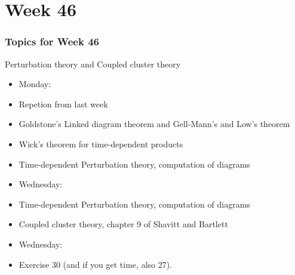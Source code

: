 \section{Week 46}
\frame
{
  \frametitle{Topics for Week 46}
  \begin{block}{Perturbation theory and Coupled cluster theory}
\begin{itemize}
\item Monday:
\item Repetion from last week
\item Goldstone's Linked diagram theorem and Gell-Mann's and Low's theorem
\item Wick's theorem for time-dependent products
\item Time-dependent Perturbation theory, computation of diagrams
\item Wednesday:
\item Time-dependent Perturbation theory, computation of diagrams
\item Coupled cluster theory, chapter 9 of Shavitt and Bartlett
\item Wednesday:
\item Exercise 30 (and if you get time, also 27).
\end{itemize}
  \end{block}
} 




%
%
%























